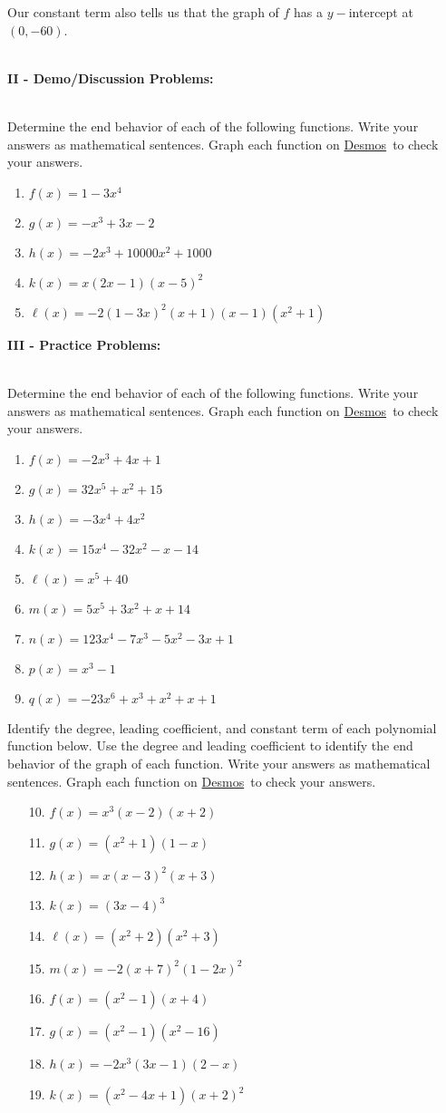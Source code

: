 \documentclass[12pt]{article}
\theoremstyle{definition}
\newcommand{\Desmos}{\href{https://www.desmos.com/}{Desmos}}
\begin{document}
Our constant term also tells us that the graph of $f$ has a $y-$intercept at $(0,-60)$.\\
\ \par
{\bf II - Demo/Discussion Problems:}\\
\ \par
Determine the end behavior of each of the following functions.  Write your answers as mathematical sentences.  Graph each function on \Desmos \ to check your answers.
\begin{enumerate}
	\item $f(x)=1-3x^4$
	\item $g(x)=-x^3+3x-2$
	\item $h(x)=-2x^3+10000x^2+1000$
	\item $k(x)=x(2x-1)(x-5)^2$
	\item $\ell(x)=-2(1-3x)^2(x+1)(x-1)(x^2+1)$
\end{enumerate}
\newpage
{\bf III - Practice Problems:}\\
\ \par
Determine the end behavior of each of the following functions.  Write your answers as mathematical sentences.  Graph each function on \Desmos \ to check your answers.
\begin{multicols}{2}
\begin{enumerate}
  \item $f(x)=-2x^3 + 4x+1$
	\item $g(x)=32x^5+x^2+15$
	\item $h(x)=-3x^4+4x^2$
	\item $k(x)=15x^4-32x^2-x-14$
  \item $\ell(x)=x^5+40$
  \item $m(x)=5x^5+3x^2+x+14$
  \item $n(x)=123x^4-7x^3-5x^2-3x+1$
	\item $p(x)=x^3-1$
  \item $q(x)=-23x^6+x^3+x^2+x+1$
\end{enumerate}
\end{multicols}
Identify the degree, leading coefficient, and constant term of each polynomial function below.  Use the degree and leading coefficient to identify the end behavior of the graph of each function.  Write your answers as mathematical sentences.  Graph each function on \Desmos \ to check your answers.
\begin{multicols}{2}
\begin{enumerate}
    \item[10.] $f(x)=x^3(x-2)(x+2)$
	\item[11.] $g(x)=(x^2+1)(1-x)$
	\item[12.] $h(x)=x(x-3)^2(x+3)$
	\item[13.] $k(x)=(3x-4)^3$
    \item[14.] $\ell(x)=(x^2+2)(x^2+3)$
    \item[15.] $m(x)=-2(x+7)^2(1-2x)^2$
    \item[16.] $f(x)=(x^2-1)(x+4)$
	\item[17.] $g(x)=(x^2-1)(x^2-16)$
	\item[18.] $h(x)=-2x^3(3x-1)(2-x)$
	\item[19.] $k(x)=(x^2-4x+1)(x+2)^2$
\end{enumerate}
\end{multicols}
\newpage
\end{document}
